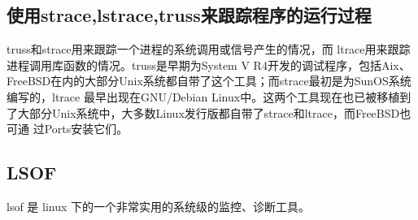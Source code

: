 \subsection{使用strace,lstrace,truss来跟踪程序的运行过程}
truss和strace用来跟踪一个进程的系统调用或信号产生的情况，而 ltrace用来跟踪进程调用库函数的情况。truss是早期为System V 
R4开发的调试程序，包括Aix、FreeBSD在内的大部分Unix系统都自带了这个工具；而strace最初是为SunOS系统编写的，ltrace 最早出现在GNU/Debian 
Linux中。这两个工具现在也已被移植到了大部分Unix系统中，大多数Linux发行版都自带了strace和ltrace，而FreeBSD也可通 过Ports安装它们。

\subsection{LSOF}
lsof 是 linux 下的一个非常实用的系统级的监控、诊断工具。